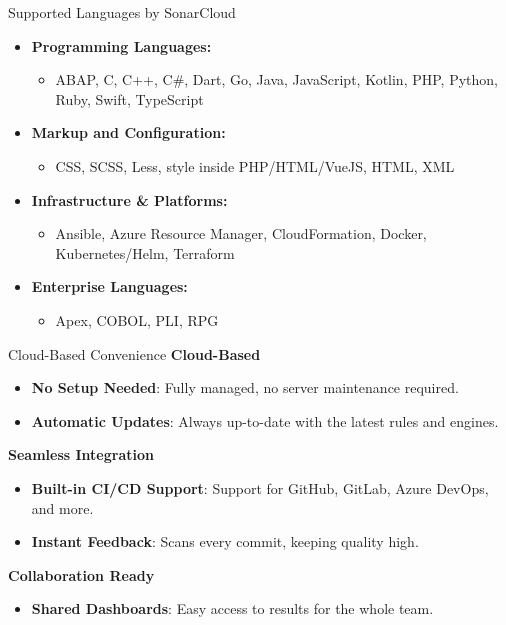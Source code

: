 \documentclass{beamer}
\begin{document}
\begin{frame}{Supported Languages by SonarCloud}
  \begin{itemize}
      \item \textbf{Programming Languages:}
      \begin{itemize}
          \item ABAP, C, C++, C\#, Dart, Go, Java, JavaScript, Kotlin, PHP, Python, Ruby, Swift, TypeScript
      \end{itemize}
      \vspace*{0.5em}
        \item \textbf{Markup and Configuration:}
      \begin{itemize}
        \item CSS, SCSS, Less, style inside PHP/HTML/VueJS, HTML, XML
      \end{itemize}
      \vspace*{0.5em}
      \item \textbf{Infrastructure \& Platforms:}
      \begin{itemize}
        \item Ansible, Azure Resource Manager, CloudFormation, Docker, Kubernetes/Helm, Terraform
      \end{itemize}
      \vspace*{0.5em}
      \item \textbf{Enterprise Languages:}
      \begin{itemize}
        \item Apex, COBOL, PLI, RPG
      \end{itemize}
  \end{itemize}
\end{frame}


\begin{frame}{Cloud-Based Convenience}
  \textbf{Cloud-Based}
  \begin{itemize}
      \item \textbf{No Setup Needed}: Fully managed, no server maintenance required.
      \item \textbf{Automatic Updates}: Always up-to-date with the latest rules and engines.
  \end{itemize}
  
  \textbf{Seamless Integration}
  \begin{itemize}
      \item \textbf{Built-in CI/CD Support}: Support for GitHub, GitLab, Azure DevOps, and more.
      \item \textbf{Instant Feedback}: Scans every commit, keeping quality high.
  \end{itemize}
  
  \textbf{Collaboration Ready}
  \begin{itemize}
      \item \textbf{Shared Dashboards}: Easy access to results for the whole team.
  \end{itemize}
\end{frame}
\end{document}
